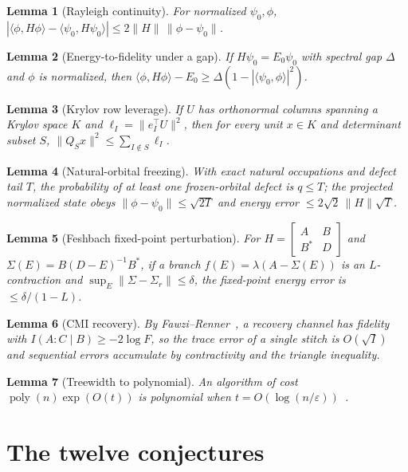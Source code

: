 \documentclass[11pt]{article}
\newtheorem{lemma}{Lemma}
\theoremstyle{definition}
\newcommand{\eps}{\varepsilon}
\newcommand{\poly}{\operatorname{poly}}
\begin{document}
\begin{lemma}[Rayleigh continuity]\label{lem:rayleigh}
For normalized $\psi_0,\phi$, $|\langle\phi,H\phi\rangle-\langle\psi_0,H\psi_0\rangle|\le2\lVert H\rVert\,\lVert\phi-\psi_0\rVert$.
\end{lemma}
\begin{lemma}[Energy-to-fidelity under a gap]\label{lem:gap}
If $H\psi_0=E_0\psi_0$ with spectral gap $\Delta$ and $\phi$ is normalized, then $\langle\phi,H\phi\rangle-E_0\ge\Delta(1-|\langle\psi_0,\phi\rangle|^2)$.
\end{lemma}
\begin{lemma}[Krylov row leverage]\label{lem:lev}
If $U$ has orthonormal columns spanning a Krylov space $K$ and $\ell_I=\lVert e_I^\top U\rVert^2$, then for every unit $x\in K$ and determinant subset $S$, $\lVert Q_Sx\rVert^2\le\sum_{I\notin S}\ell_I$.
\end{lemma}
\begin{lemma}[Natural-orbital freezing]\label{lem:freeze}
With exact natural occupations and defect tail $T$, the probability of at least one frozen-orbital defect is $q\le T$; the projected normalized state obeys $\lVert\phi-\psi_0\rVert\le\sqrt{2T}$ and energy error $\le2\sqrt2\,\lVert H\rVert\sqrt T$.
\end{lemma}
\begin{lemma}[Feshbach fixed-point perturbation]\label{lem:fesh}
For $H=\left[\begin{smallmatrix}A&B\\B^*&D\end{smallmatrix}\right]$ and $\Sigma(E)=B(D-E)^{-1}B^*$, if a branch $f(E)=\lambda(A-\Sigma(E))$ is an $L$-contraction and $\sup_E\lVert\Sigma-\Sigma_r\rVert\le\delta$, the fixed-point energy error is $\le\delta/(1-L)$.
\end{lemma}
\begin{lemma}[CMI recovery]\label{lem:cmi}
By Fawzi--Renner~\cite{R13}, a recovery channel has fidelity with $I(A:C\mid B)\ge-2\log F$, so the trace error of a single stitch is $O(\sqrt I)$ and sequential errors accumulate by contractivity and the triangle inequality.
\end{lemma}
\begin{lemma}[Treewidth to polynomial]\label{lem:tw}
An algorithm of cost $\poly(n)\exp(O(t))$ is polynomial when $t=O(\log(n/\eps))$~\cite{R11}.
\end{lemma}

\section{The twelve conjectures}
\end{document}
